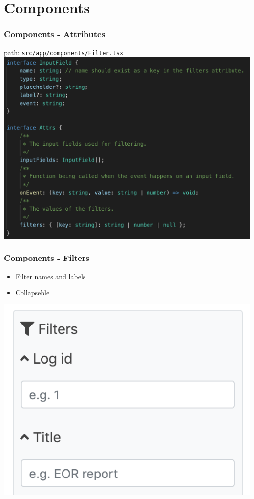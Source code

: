 \documentclass[12pt]{beamer}
\begin{document}
	\section{Components}
	\begin{frame}
		\frametitle{Components - Attributes}
		path: \texttt{src/app/components/Filter.tsx}
		\includegraphics[scale=.4]{../assets/vnode-attrs.png}
	\end{frame}

	\begin{frame}
		\frametitle{Components - Filters}
		\begin{itemize}
			\item Filter names and labels
			\item Collapseble
		\end{itemize}
		\includegraphics[scale=.5]{../assets/filter-element.png}
	\end{frame}
\end{document}
